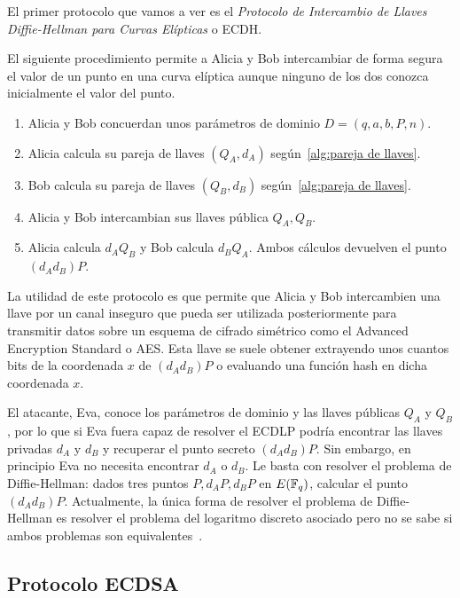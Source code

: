 El primer protocolo que vamos a ver es el \emph{Protocolo de Intercambio de Llaves Diffie-Hellman para Curvas Elípticas} o ECDH.

\begin{protocolo}[ECDH]\label{pc:diffie-hellman}
    El siguiente procedimiento permite a Alicia y Bob intercambiar de forma segura el valor de un punto en una curva elíptica aunque ninguno de los dos conozca inicialmente el valor del punto.

    \begin{enumerate}
        \item Alicia y Bob concuerdan unos parámetros de dominio $D = (q, a, b, P, n)$.
        \item Alicia calcula su pareja de llaves $(Q_A, d_A)$ según~\ref{alg:pareja de llaves}.
        \item Bob calcula su pareja de llaves $(Q_B, d_B)$ según~\ref{alg:pareja de llaves}.
        \item Alicia y Bob intercambian sus llaves pública $Q_A, Q_B$.
        \item Alicia calcula $d_A Q_B$ y Bob calcula $d_B Q_A$. Ambos cálculos devuelven el punto $(d_A d_B) P$.
    \end{enumerate}
\end{protocolo}

La utilidad de este protocolo es que permite que Alicia y Bob intercambien una llave por un canal inseguro que pueda ser utilizada posteriormente para transmitir datos sobre un esquema de cifrado simétrico como el Advanced Encryption Standard o AES. Esta llave se suele obtener extrayendo unos cuantos bits de la coordenada $x$ de $(d_A d_B) P$ o evaluando una función hash en dicha coordenada $x$.

El atacante, Eva, conoce los parámetros de dominio y las llaves públicas $Q_A$ y $Q_B$, por lo que si Eva fuera capaz de resolver el ECDLP podría encontrar las llaves privadas $d_A$ y $d_B$ y recuperar el punto secreto $(d_A d_B) P$. Sin embargo, en principio Eva no necesita encontrar $d_A$ o $d_B$. Le basta con resolver el problema de Diffie-Hellman: dados tres puntos $P, d_A P, d_B P$ en $E(\mathbb{F}_q)$, calcular el punto $(d_A d_B) P$. Actualmente, la única forma de resolver el problema de Diffie-Hellman es resolver el problema del logaritmo discreto asociado pero no se sabe si ambos problemas son equivalentes~\cite{Hankerson:2003}.

\subsection{Protocolo ECDSA}
\label{sub:Protocolo ECDSA}

